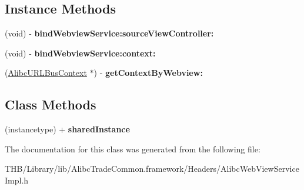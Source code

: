 \subsection*{Instance Methods}
\begin{DoxyCompactItemize}
\item 
\mbox{\label{interface_alibc_web_view_service_impl_a0c61daa5bf19a560944b15eea46caf3b}} 
(void) -\/ {\bfseries bind\+Webview\+Service\+:source\+View\+Controller\+:}
\item 
\mbox{\label{interface_alibc_web_view_service_impl_ac3058ca6abdfb6cf7aafa45e3a853c9d}} 
(void) -\/ {\bfseries bind\+Webview\+Service\+:context\+:}
\item 
\mbox{\label{interface_alibc_web_view_service_impl_add2414c056f5fc9312fab110860dd779}} 
(\mbox{\hyperlink{interface_alibc_u_r_l_bus_context}{Alibc\+U\+R\+L\+Bus\+Context}} $\ast$) -\/ {\bfseries get\+Context\+By\+Webview\+:}
\end{DoxyCompactItemize}
\subsection*{Class Methods}
\begin{DoxyCompactItemize}
\item 
\mbox{\label{interface_alibc_web_view_service_impl_ab6e95d4fd5c936285458236e23e6bd78}} 
(instancetype) + {\bfseries shared\+Instance}
\end{DoxyCompactItemize}


The documentation for this class was generated from the following file\+:\begin{DoxyCompactItemize}
\item 
T\+H\+B/\+Library/lib/\+Alibc\+Trade\+Common.\+framework/\+Headers/Alibc\+Web\+View\+Service\+Impl.\+h\end{DoxyCompactItemize}
